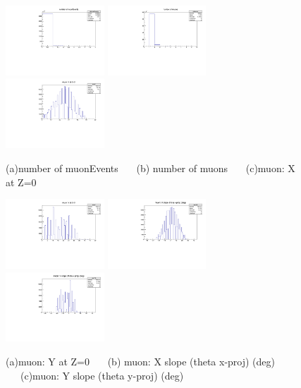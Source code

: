 \documentclass[a4paper,11pt]{article}
\theoremstyle{mytheor}
\begin{document}
\begin{figure}[H] 
\vspace*{-0.3cm} 
\includegraphics[width=0.33\textwidth,scale=0.5,trim=0 0 0 0,clip]{plotsdir/file0_test-nMuonEvents-1.pdf} 
\includegraphics[width=0.33\textwidth,scale=0.5,trim=0 0 0 0,clip]{plotsdir/file0_test-nMuons-1.pdf} 
\includegraphics[width=0.33\textwidth,scale=0.5,trim=0 0 0 0,clip]{plotsdir/file0_test-muX-1.pdf} 
\caption{(a)number of muonEvents ~~~(b) number of muons ~~~(c)muon: X at Z=0 } 
\end{figure} 
\begin{figure}[H] 
\vspace*{-0.3cm} 
\includegraphics[width=0.33\textwidth,scale=0.5,trim=0 0 0 0,clip]{plotsdir/file0_test-muY-1.pdf} 
\includegraphics[width=0.33\textwidth,scale=0.5,trim=0 0 0 0,clip]{plotsdir/file0_test-muXS-1.pdf} 
\includegraphics[width=0.33\textwidth,scale=0.5,trim=0 0 0 0,clip]{plotsdir/file0_test-muYS-1.pdf} 
\caption{(a)muon: Y at Z=0 ~~~(b) muon: X slope (theta x-proj) (deg) ~~~(c)muon: Y slope (theta y-proj) (deg) } 
\end{figure} 
\end{document}
